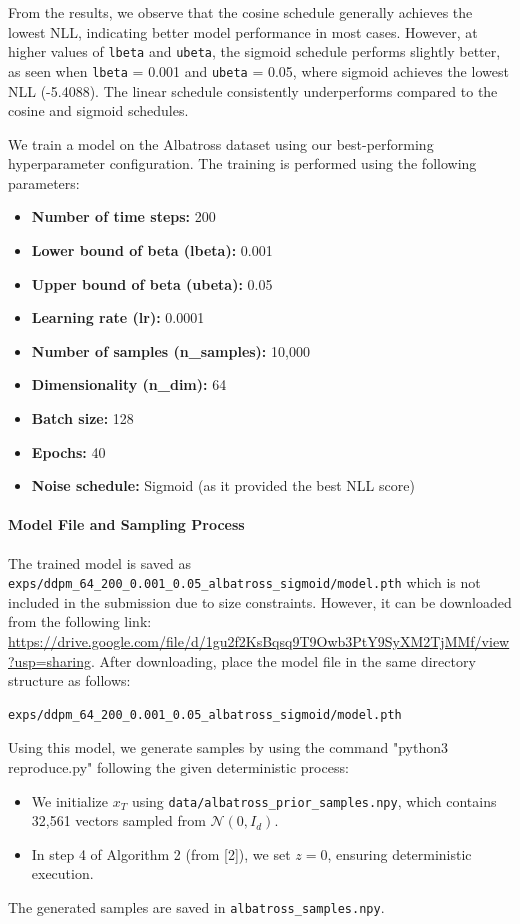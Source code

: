 \documentclass[a4paper,12pt]{article}
\begin{document}
From the results, we observe that the cosine schedule generally achieves the lowest NLL, indicating better model performance in most cases. However, at higher values of \texttt{lbeta} and \texttt{ubeta}, the sigmoid schedule performs slightly better, as seen when \texttt{lbeta} = 0.001 and \texttt{ubeta} = 0.05, where sigmoid achieves the lowest NLL (-5.4088). The linear schedule consistently underperforms compared to the cosine and sigmoid schedules. 



\clearpage
We train a model on the Albatross dataset using our best-performing hyperparameter configuration. The training is performed using the following parameters:

\begin{itemize}
    \item \textbf{Number of time steps:} 200
    \item \textbf{Lower bound of beta (lbeta):} 0.001
    \item \textbf{Upper bound of beta (ubeta):} 0.05
    \item \textbf{Learning rate (lr):} 0.0001
    \item \textbf{Number of samples (n\_samples):} 10,000
    \item \textbf{Dimensionality (n\_dim):} 64
    \item \textbf{Batch size:} 128
    \item \textbf{Epochs:} 40
    \item \textbf{Noise schedule:} Sigmoid (as it provided the best NLL score)
\end{itemize}

\paragraph{Model File and Sampling Process}  
The trained model is saved as 
\\
\texttt{exps/ddpm\_64\_200\_0.001\_0.05\_albatross\_sigmoid/model.pth} which is not included in the submission due to size constraints. However, it can be downloaded from the following link: \url{https://drive.google.com/file/d/1gu2f2KsBqsq9T9Owb3PtY9SyXM2TjMMf/view?usp=sharing}.
After downloading, place the model file in the same directory structure as follows:
\begin{verbatim}
exps/ddpm_64_200_0.001_0.05_albatross_sigmoid/model.pth
\end{verbatim}
Using this model, we generate samples by using the command "python3 reproduce.py" following the given deterministic process:  
\begin{itemize}
    \item We initialize $x_T$ using \texttt{data/albatross\_prior\_samples.npy}, which contains 32,561 vectors sampled from $\mathcal{N}(0, I_d)$.
    \item In step 4 of Algorithm 2 (from [2]), we set $z = 0$, ensuring deterministic execution.
\end{itemize}  
The generated samples are saved in \texttt{albatross\_samples.npy}.  
\end{document}
